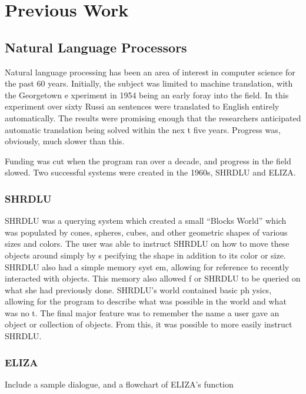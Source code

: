 \chapter{Previous Work}\label{text}                                                                   
\section{Natural Language Processors}                                                  
Natural language processing has been an area of interest in computer science for the past 
60 years. Initially, the subject was limited to machine translation, with the Georgetown e
xperiment in 1954 being an early foray into the field. In this experiment over sixty Russi
an sentences were translated to English entirely automatically. The results were promising
 enough that the researchers anticipated automatic translation being solved within the nex
t five years. \cite{Hutchins} Progress was, obviously, much slower than this.             
                                                                                          
Funding was cut when the program ran over a decade, and progress in the field slowed. Two 
successful systems were created in the 1960s, SHRDLU and ELIZA.                           
                                                                                          
\subsection{SHRDLU}                                                                    
SHRDLU was a querying system which created a small ``Blocks World'' which was populated by
 cones, spheres, cubes, and other geometric shapes of various sizes and colors. \cite{wino
grad} The user was able to instruct SHRDLU on how to move these objects around simply by s
pecifying the shape in addition to its color or size. SHRDLU also had a simple memory syst
em, allowing for reference to recently interacted with objects. This memory also allowed f
or SHRDLU to be queried on what she had previously done. SHRDLU's world contained basic ph
ysics, allowing for the program to describe what was possible in the world and what was no
t. The final major feature was to remember the name a user gave an object or collection of
 objects. From this, it was possible to more easily instruct SHRDLU.                      
                                                                                          
\subsection{ELIZA}                                                                     
                                                                                          
{Include a sample dialogue, and a flowchart of ELIZA's function}
